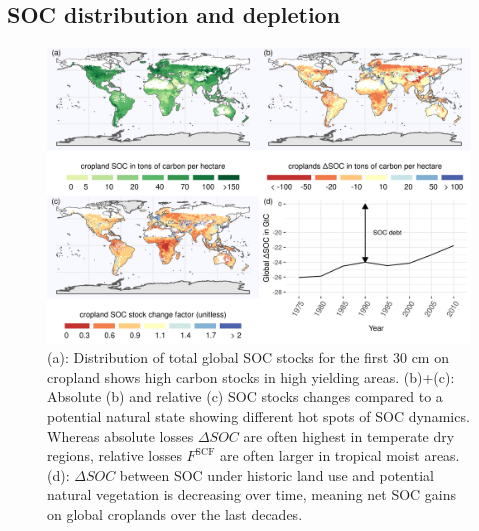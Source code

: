 \documentclass[gc, manuscript]{copernicus}
\begin{document}
\hypertarget{soc-distribution-and-depletion}{%
\subsection{SOC distribution and depletion}\label{soc-distribution-and-depletion}}

\begin{figure}[h]
\includegraphics[width=18cm]{../ResultNotebooks/Output/Images/4panelfigure} \caption{(a): Distribution of total global SOC stocks for the first 30 cm on cropland shows high carbon stocks in high yielding areas. (b)+(c): Absolute (b) and relative (c) SOC stocks changes compared to a potential natural state showing different hot spots of SOC dynamics. Whereas absolute losses $\Delta SOC$ are often highest in temperate dry regions, relative losses $F^\mathrm{SCF}$ are often larger in tropical moist areas. (d): $\Delta SOC$ between SOC under historic land use and potential natural vegetation is decreasing over time, meaning net SOC gains on global croplands over the last decades. }\label{fig:SOCmaps}
\end{figure}
\end{document}
